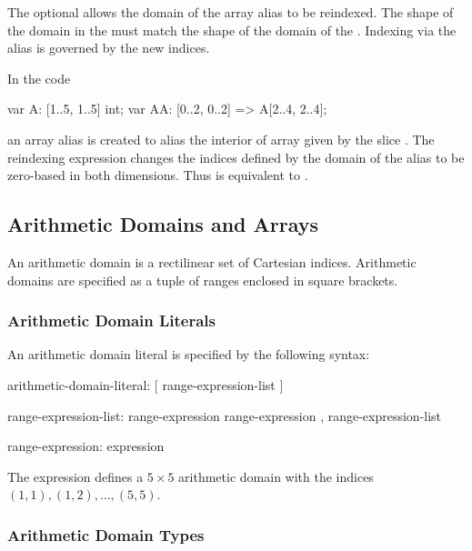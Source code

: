 The optional  allows the domain of the
array alias to be reindexed.  The shape of the domain in
the  must match the shape of the domain of
the .  Indexing via the alias is governed by
the new indices.

\begin{example}
In the code
\begin{chapel}
var A: [1..5, 1..5] int;
var AA: [0..2, 0..2] => A[2..4, 2..4];
\end{chapel}
an array alias  is created to alias the interior of
array  given by the slice .  The
reindexing expression changes the indices defined by the domain of the
alias to be zero-based in both dimensions.  Thus  is
equivalent to .
\end{example}

\subsection{Arithmetic Domains and Arrays}
\label{Arithmetic_Domains_and_Arrays}

An arithmetic domain is a rectilinear set of Cartesian indices.
Arithmetic domains are specified as a tuple of ranges enclosed in
square brackets.

\subsubsection{Arithmetic Domain Literals}
\label{Arithmetic_Domain_Literals}

An arithmetic domain literal is specified by the following syntax:
\begin{syntax}
arithmetic-domain-literal:
  [ range-expression-list ]

range-expression-list:
  range-expression
  range-expression , range-expression-list

range-expression:
  expression
\end{syntax}

\begin{example}
The expression \chpl{[1..5, 1..5]} defines a $5 \times 5$ arithmetic
domain with the indices $(1, 1), (1, 2), \ldots, (5, 5)$.
\end{example}

\subsubsection{Arithmetic Domain Types}
\label{Arithmetic_Domain_Types}

